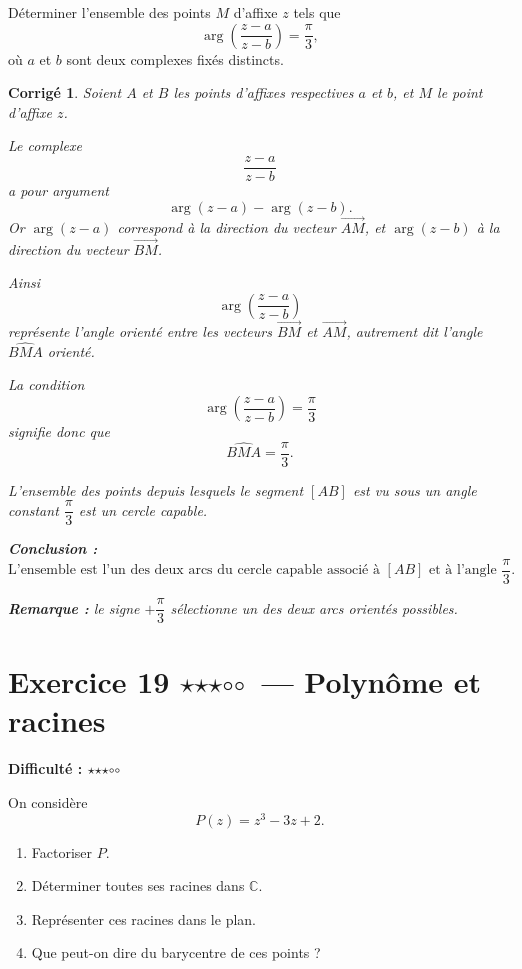 \documentclass[11pt,a4paper]{article}
\newtheorem*{corrige}{Corrigé}
\newcommand{\C}{\mathbb{C}}
\newcommand{\fullstar}{\(\star\)}
\newcommand{\emptystar}{\(\circ\)}
\newcommand{\threeStars}{\fullstar\fullstar\fullstar\emptystar\emptystar}
\newcommand{\difficulty}[1]{\textbf{Difficulté : #1}}
\begin{document}
Déterminer l'ensemble des points \(M\) d'affixe \(z\) tels que
\[
\arg\left(\frac{z-a}{z-b}\right)=\frac{\pi}{3},
\]
où \(a\) et \(b\) sont deux complexes fixés distincts.

\begin{corrige}
Soient \(A\) et \(B\) les points d'affixes respectives \(a\) et \(b\), et \(M\) le point d'affixe \(z\).

Le complexe
\[
\frac{z-a}{z-b}
\]
a pour argument
\[
\arg(z-a)-\arg(z-b).
\]
Or \(\arg(z-a)\) correspond à la direction du vecteur \(\overrightarrow{AM}\), et \(\arg(z-b)\) à la direction du vecteur \(\overrightarrow{BM}\).

Ainsi
\[
\arg\left(\frac{z-a}{z-b}\right)
\]
représente l'angle orienté entre les vecteurs \(\overrightarrow{BM}\) et \(\overrightarrow{AM}\), autrement dit l'angle \(\widehat{BMA}\) orienté.

La condition
\[
\arg\left(\frac{z-a}{z-b}\right)=\frac{\pi}{3}
\]
signifie donc que
\[
\widehat{BMA}=\frac{\pi}{3}.
\]

L'ensemble des points depuis lesquels le segment \([AB]\) est vu sous un angle constant \(\dfrac{\pi}{3}\) est un \emph{cercle capable}.

\textbf{Conclusion :}
\[
\boxed{\text{L'ensemble est l'un des deux arcs du cercle capable associé à }[AB]\text{ et à l'angle }\frac{\pi}{3}.}
\]

\textbf{Remarque :} le signe \(+\dfrac{\pi}{3}\) sélectionne un des deux arcs orientés possibles.
\end{corrige}

\section{Exercice 19 \threeStars\ --- Polynôme et racines}
\difficulty{\threeStars}

On considère
\[
P(z)=z^3-3z+2.
\]

\begin{enumerate}
    \item Factoriser \(P\).
    \item Déterminer toutes ses racines dans \(\C\).
    \item Représenter ces racines dans le plan.
    \item Que peut-on dire du barycentre de ces points ?
\end{enumerate}
\end{document}
